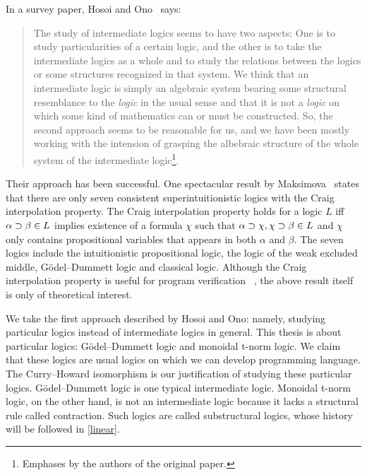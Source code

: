 In a survey paper, Hosoi and Ono~\cite{hosoi-ono} says:
 \begin{quote}
  The study of intermediate logics seems to have two aspects: One is to
  study particularities of a certain logic, and the other is to take the
  intermediate logics as a whole and to study the relations between the
  logics or some structures recognized in that system.  We think that an
  intermediate logic is simply an algebraic system bearing some
  structural resemblance to the \textit{logic} in the usual sense and
  that it is not a \textit{logic} on which some kind of mathematics can
  or must be constructed.  So, the second approach seems to be
  reasonable for us, and we have been mostly working with the intension
  of grasping the albebraic structure of the whole system of the
  intermediate logic\footnote{Emphases by the authors of the original
  paper.}.
 \end{quote}
Their approach has been successful.
One spectacular result by Maksimova~\citep{maksimova77}
states that there are only seven consistent
superintuitionistic logics with the Craig interpolation
property.
The Craig interpolation property holds for a logic $L$ iff $\alpha
\supset\beta\in L$ implies existence of a formula $\chi$ such that
$\alpha\supset\chi, \chi\supset\beta\in L$ and $\chi$ only contains propositional
variables that appears in both $\alpha$ and $\beta$.
The seven logics include the intuitionistic propositional logic, the logic of
the weak excluded middle,
G\"odel--Dummett logic
and classical logic.
Although the Craig interpolation property is useful for program
verification~\citep{unno2009} ,
the above result itself is only of
theoretical interest.

We take the first approach described by Hosoi and Ono: namely,
studying particular logics instead of intermediate logics in general.
This thesis is about particular logics: G\"odel--Dummett logic and
monoidal t-norm logic.  We claim that these logics are usual logics
on which we can develop programming language.  The Curry--Howard
isomorphism is our justification of studying these particular logics.
G\"odel--Dummett logic is one typical intermediate logic.
Monoidal t-norm logic, on the other hand, is not an intermediate logic
because it lacks a structural rule called contraction.  Such logics are
called substructural logics, whose history will be followed in \ref{linear}.

